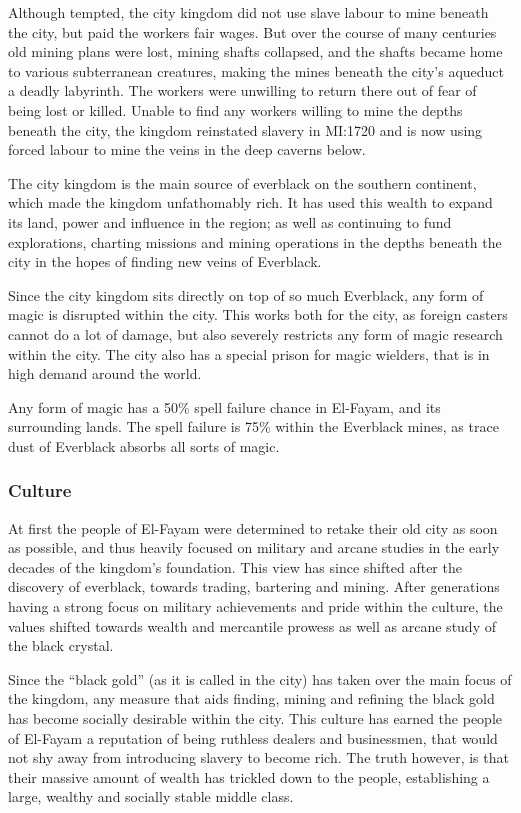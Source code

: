 Although tempted, the city kingdom did not use slave labour to mine beneath
the city, but paid the workers fair wages. But over the course of many
centuries old mining plans were lost, mining shafts collapsed, and the shafts
became home to various subterranean creatures, making the mines beneath the
city's aqueduct a deadly labyrinth. The workers were unwilling to return
there out of fear of being lost or killed. Unable to find any workers willing
to mine the depths beneath the city, the kingdom reinstated slavery in MI:1720
and is now using forced labour to mine the veins in the deep caverns below.

The city kingdom is the main source of everblack on the southern continent,
which made the kingdom unfathomably rich. It has used this wealth to expand
its land, power and influence in the region; as well as continuing to fund
explorations, charting missions and mining operations in the depths beneath
the city in the hopes of finding new veins of Everblack.

Since the city kingdom sits directly on top of so much Everblack, any form
of magic is disrupted within the city. This works both for the city, as
foreign casters cannot do a lot of damage, but also severely restricts any
form of magic research within the city. The city also has a special prison
for magic wielders, that is in high demand around the world.

\begin{note}
  Any form of magic has a 50\% spell failure chance in El-Fayam, and its
  surrounding lands. The spell failure is 75\% within the Everblack mines,
  as trace dust of Everblack absorbs all sorts of magic.
\end{note}

\subsubsection{Culture}

At first the people of El-Fayam were determined to retake their old city as
soon as possible, and thus heavily focused on military and arcane studies in
the early decades of the kingdom's foundation. This view has since shifted after
the discovery of everblack, towards trading, bartering and mining. After
generations having a strong focus on military achievements and pride within
the culture, the values shifted towards wealth and mercantile prowess as well
as arcane study of the black crystal.

Since the ``black gold'' (as it is called in the city) has taken over the main
focus of the kingdom, any measure that aids finding, mining and refining the
black gold has become socially desirable within the city. This culture has
earned the people of El-Fayam a reputation of being ruthless dealers and
businessmen, that would not shy away from introducing slavery to become rich.
The truth however, is that their massive amount of wealth has trickled down
to the people, establishing a large, wealthy and socially stable middle class.

